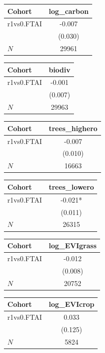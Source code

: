 {
\def\sym#1{\ifmmode^{#1}\else\(^{#1}\)\fi}
\begin{tabular}{l*{1}{c}}
\toprule
Cohort    &log\_carbon   \\
\midrule
r1vs0.FTAI&   -0.007   \\
          &  (0.030)   \\
\midrule
\(N\)     &    29961   \\
\bottomrule
\end{tabular}
}
{
\def\sym#1{\ifmmode^{#1}\else\(^{#1}\)\fi}
\begin{tabular}{l*{1}{c}}
\toprule
Cohort    &   biodiv   \\
\midrule
r1vs0.FTAI&   -0.001   \\
          &  (0.007)   \\
\midrule
\(N\)     &    29963   \\
\bottomrule
\end{tabular}
}
{
\def\sym#1{\ifmmode^{#1}\else\(^{#1}\)\fi}
\begin{tabular}{l*{1}{c}}
\toprule
Cohort    &trees\_highero   \\
\midrule
r1vs0.FTAI&   -0.007   \\
          &  (0.010)   \\
\midrule
\(N\)     &    16663   \\
\bottomrule
\end{tabular}
}
{
\def\sym#1{\ifmmode^{#1}\else\(^{#1}\)\fi}
\begin{tabular}{l*{1}{c}}
\toprule
Cohort    &trees\_lowero   \\
\midrule
r1vs0.FTAI&   -0.021*  \\
          &  (0.011)   \\
\midrule
\(N\)     &    26315   \\
\bottomrule
\end{tabular}
}
{
\def\sym#1{\ifmmode^{#1}\else\(^{#1}\)\fi}
\begin{tabular}{l*{1}{c}}
\toprule
Cohort    &log\_EVIgrass   \\
\midrule
r1vs0.FTAI&   -0.012   \\
          &  (0.008)   \\
\midrule
\(N\)     &    20752   \\
\bottomrule
\end{tabular}
}
{
\def\sym#1{\ifmmode^{#1}\else\(^{#1}\)\fi}
\begin{tabular}{l*{1}{c}}
\toprule
Cohort    &log\_EVIcrop   \\
\midrule
r1vs0.FTAI&    0.033   \\
          &  (0.125)   \\
\midrule
\(N\)     &     5824   \\
\bottomrule
\end{tabular}
}
